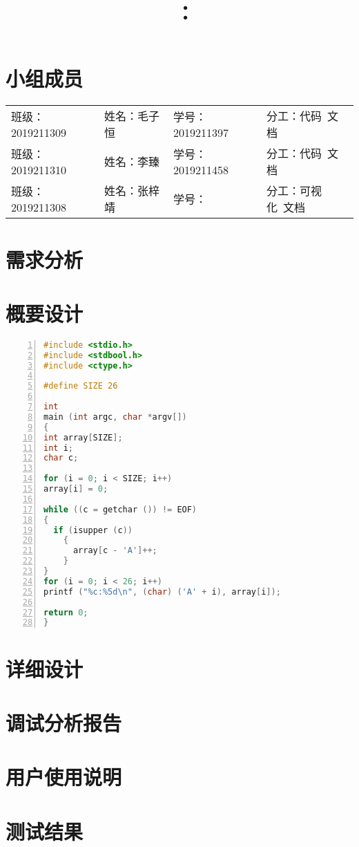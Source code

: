 \documentclass{article}
\title{\hmwkClass\ ：\hmwkTitle}
\author{\hmwkAuthorName}
\begin{document}
\maketitle

\section*{小组成员}

\setlength{\tabcolsep}{9mm}
{
\begin{table}[htbp]
    \centering
    \begin{tabular}{llll}
        班级：2019211309 & 姓名：毛子恒 & 学号：2019211397 & 分工：代码\ 文档\\
 
        班级：2019211310 & 姓名：李臻 & 学号：2019211458 & 分工：代码\ 文档\\

        班级：2019211308 & 姓名：张梓靖 & 学号： & 分工：可视化\ 文档\\
    \end{tabular}
\end{table}
}

\section{需求分析}

\section{概要设计}

\begin{lstlisting}[language={C},
    numbers=left,
    numberstyle=\tiny\menlo,
    basicstyle=\small\menlo]
#include <stdio.h>
#include <stdbool.h>
#include <ctype.h>

#define SIZE 26

int
main (int argc, char *argv[])
{
int array[SIZE];
int i;
char c;

for (i = 0; i < SIZE; i++)
array[i] = 0;

while ((c = getchar ()) != EOF)
{
  if (isupper (c))
    {
      array[c - 'A']++;
    }
}
for (i = 0; i < 26; i++)
printf ("%c:%5d\n", (char) ('A' + i), array[i]);

return 0;
}
\end{lstlisting}

\section{详细设计}

\section{调试分析报告}

\section{用户使用说明}

\section{测试结果}
\end{document}
